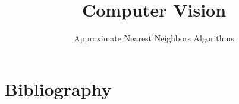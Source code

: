 
\title{Computer Vision}
\subtitle{Approximate Nearest Neighbors Algorithms}




	
	
	
	
	
	\section*{Bibliography}
		
	
		
